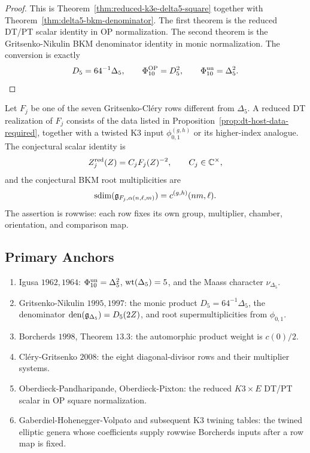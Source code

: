 \begin{proof}
This is Theorem~\ref{thm:reduced-k3e-delta5-square} together with
Theorem~\ref{thm:delta5-bkm-denominator}.  The first theorem is the
reduced DT/PT scalar identity in OP normalization.  The second theorem
is the Gritsenko-Nikulin BKM denominator identity in monic
normalization.  The conversion is exactly
\[
        D_5=64^{-1}\Delta_5,\qquad
        \Phi_{10}^{\mathrm{OP}}=D_5^2,\qquad
        \Phi_{10}^{\mathrm{un}}=\Delta_5^2 .
\]
\end{proof}

\begin{conjecture}
\label{conj:catalogue-row-dt-realization}
Let \(F_j\) be one of the seven Gritsenko-Cl\'ery rows different from
\(\Delta_5\).  A reduced DT realization of \(F_j\) consists of the data
listed in Proposition~\ref{prop:dt-host-data-required}, together with a
twisted K3 input \(\phi^{(g,h)}_{0,1}\) or its higher-index analogue.
The conjectural scalar identity is
\[
        Z_j^{\mathrm{red}}(Z)=C_jF_j(Z)^{-2},
        \qquad C_j\in\mathbb{C}^\times,
\]
and the conjectural BKM root multiplicities are
\[
        \operatorname{sdim}(\mathfrak{g}_{F_j,\alpha(n,\ell,m)})
        =c^{(g,h)}(nm,\ell).
\]
The assertion is rowwise: each row fixes its own group, multiplier,
chamber, orientation, and comparison map.
\end{conjecture}

\subsection{Primary Anchors}
\label{subsec:primary-anchors}

\begin{enumerate}
\item Igusa \(1962,1964\): \(\Phi_{10}^{\mathrm{un}}=\Delta_5^2\),
\(\operatorname{wt}(\Delta_5)=5\), and the Maass character \(\nu_{\Delta_5}\).
\item Gritsenko-Nikulin \(1995,1997\): the monic product
\(D_5=64^{-1}\Delta_5\), the denominator
\(\operatorname{den}(\mathfrak{g}_{\Delta_5})=D_5(2Z)\), and root
supermultiplicities from \(\phi_{0,1}\).
\item Borcherds \(1998\), Theorem \(13.3\): the automorphic product
weight is \(c(0)/2\).
\item Cl\'ery-Gritsenko \(2008\): the eight diagonal-divisor rows and
their multiplier systems.
\item Oberdieck-Pandharipande, Oberdieck-Pixton: the reduced
\(K3\times E\) DT/PT scalar in OP square normalization.
\item Gaberdiel-Hohenegger-Volpato and subsequent K3 twining tables:
the twined elliptic genera whose coefficients supply rowwise
Borcherds inputs after a row map is fixed.
\end{enumerate}
